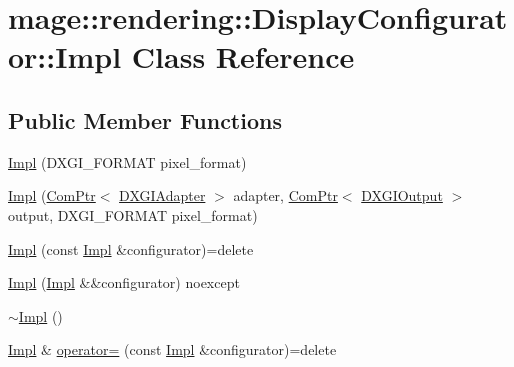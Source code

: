 \hypertarget{classmage_1_1rendering_1_1_display_configurator_1_1_impl}{}\section{mage\+:\+:rendering\+:\+:Display\+Configurator\+:\+:Impl Class Reference}
\label{classmage_1_1rendering_1_1_display_configurator_1_1_impl}
\subsection*{Public Member Functions}
\begin{DoxyCompactItemize}
\item 
\hyperlink{classmage_1_1rendering_1_1_display_configurator_1_1_impl_a0aa85d25b294d8ecec7fc83d4a6d80e2}{Impl} (D\+X\+G\+I\+\_\+\+F\+O\+R\+M\+AT pixel\+\_\+format)
\item 
\hyperlink{classmage_1_1rendering_1_1_display_configurator_1_1_impl_ab87ea2074c7c6ecdbb97ac68f96ed39f}{Impl} (\hyperlink{namespacemage_ae74f374780900893caa5555d1031fd79}{Com\+Ptr}$<$ \hyperlink{namespacemage_1_1rendering_ad55e028ebd705b547eeb972ad8d03b6a}{D\+X\+G\+I\+Adapter} $>$ adapter, \hyperlink{namespacemage_ae74f374780900893caa5555d1031fd79}{Com\+Ptr}$<$ \hyperlink{namespacemage_1_1rendering_aaf22d3893277a4bd8497f6ea69b01532}{D\+X\+G\+I\+Output} $>$ output, D\+X\+G\+I\+\_\+\+F\+O\+R\+M\+AT pixel\+\_\+format)
\item 
\hyperlink{classmage_1_1rendering_1_1_display_configurator_1_1_impl_acf8b6a3749108ad9f7a7c14c291d48b6}{Impl} (const \hyperlink{classmage_1_1rendering_1_1_display_configurator_1_1_impl}{Impl} \&configurator)=delete
\item 
\hyperlink{classmage_1_1rendering_1_1_display_configurator_1_1_impl_af8ddd060b24cd09deb2beef7737f5277}{Impl} (\hyperlink{classmage_1_1rendering_1_1_display_configurator_1_1_impl}{Impl} \&\&configurator) noexcept
\item 
\hyperlink{classmage_1_1rendering_1_1_display_configurator_1_1_impl_a499b92d9d77a4c31cbdefa3a3c22a0be}{$\sim$\+Impl} ()
\item 
\hyperlink{classmage_1_1rendering_1_1_display_configurator_1_1_impl}{Impl} \& \hyperlink{classmage_1_1rendering_1_1_display_configurator_1_1_impl_afaffb2c4689dd48c195d2a7f12c11e0b}{operator=} (const \hyperlink{classmage_1_1rendering_1_1_display_configurator_1_1_impl}{Impl} \&configurator)=delete
\item 

\end{DoxyCompactItemize}
